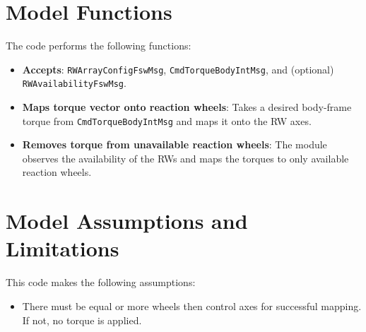 \section{Model Functions}
The code performs the following functions:
\begin{itemize}
	\item \textbf{Accepts}: \verb~RWArrayConfigFswMsg~, \verb~CmdTorqueBodyIntMsg~, and (optional) \verb~RWAvailabilityFswMsg~. 
	\item \textbf{Maps torque vector onto reaction wheels}: Takes a desired body-frame torque from  \verb~CmdTorqueBodyIntMsg~ and maps it onto the RW axes. 
	\item \textbf{Removes torque from unavailable reaction wheels}: The module observes the availability of the RWs and maps the torques to only available reaction wheels. 
\end{itemize}


\section{Model Assumptions and Limitations}
This code makes the following assumptions:
\begin{itemize}
	\item There must be equal or more wheels then control axes for successful mapping. If not, no torque is applied. 
\end{itemize}